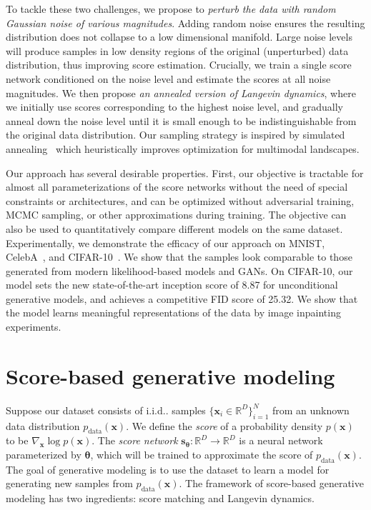 \documentclass{article}
\makeatletter
\newcommand{\mbb}[1]{\mathbb{#1}}
\def\@onedot{\ifx\@let@token.\else.\null\fi\xspace}
\DeclareRobustCommand\onedot{\futurelet\@let@token\@onedot}
\newcommand{\bfx}{\mathbf{x}}
\newcommand{\bftheta}{{\boldsymbol{\theta}}}
\newcommand{\bfs}{\mathbf{s}}
\def\iid{i.i.d\onedot}
\makeatother
\begin{document}
To tackle these two challenges, we propose to \emph{perturb the data with random Gaussian noise of various magnitudes}. Adding random noise ensures the resulting distribution does not collapse to a low dimensional manifold. Large noise levels 
will produce samples in low density regions of the original (unperturbed) data distribution,  
thus improving score estimation. 
Crucially, we train a single score network conditioned on the noise level 
and estimate the scores 
at all noise magnitudes. 
We then propose \emph{an annealed version of Langevin dynamics}, where we initially use scores corresponding to the highest noise level, and gradually anneal down the noise level until it is small enough to be indistinguishable from the original data distribution. Our sampling strategy is inspired by simulated annealing~\cite{kirkpatrick83optimizationby,neal2001annealed} which heuristically improves optimization 
for multimodal landscapes. 


Our approach has several desirable properties. First, our objective is tractable for almost all parameterizations of the score networks without the need of special constraints or architectures, and can be optimized without adversarial training, MCMC sampling, or other approximations during training. The objective can also be used to quantitatively compare different models on the same dataset. Experimentally, we demonstrate the efficacy of our approach on MNIST, CelebA~\cite{liu2015faceattributes}, and CIFAR-10~\cite{Krizhevsky09learningmultiple}. We show that the samples look comparable to those generated from modern likelihood-based models and GANs. On CIFAR-10, our model sets the new state-of-the-art inception score of 8.87 for unconditional generative models, and achieves a competitive FID score of 25.32. We show that the model learns meaningful representations of the data by image inpainting experiments.

 \section{Score-based generative modeling}
Suppose our dataset consists of \iid samples $\{\bfx_i \in \mbb{R}^D \}_{i=1}^N$ from an unknown data distribution $p_\text{data}(\bfx)$. We define the \emph{score} of a probability density $p(\bfx)$ to be $\nabla_\bfx \log p(\bfx)$. The \emph{score network} $\bfs_\bftheta: \mbb{R}^D \rightarrow \mbb{R}^D$ is a neural network parameterized by $\bftheta$, which will be trained to approximate the score of $p_\text{data}(\bfx)$. The goal of generative modeling is to use the dataset to learn a model for generating new samples from $p_\text{data}(\bfx)$. The framework of score-based generative modeling has two ingredients: score matching and Langevin dynamics.
\end{document}
